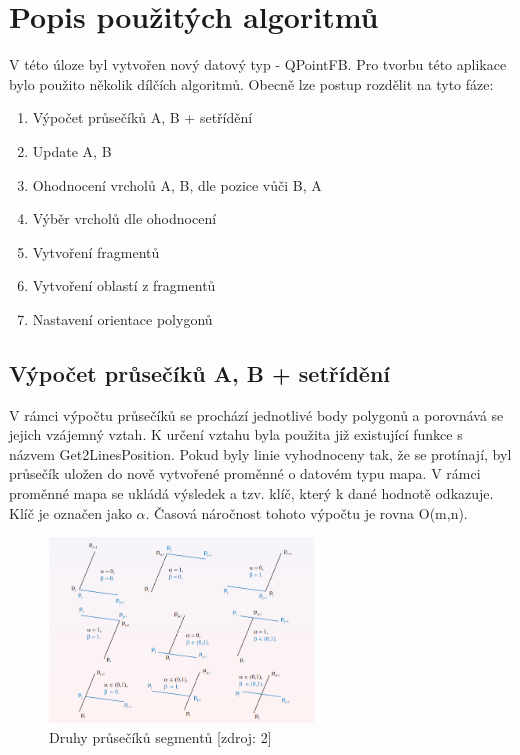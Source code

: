 \documentclass[a4paper, 12pt]{article}
\begin{document}
\section{Popis použitých algoritmů}
V této úloze byl vytvořen nový datový typ - QPointFB. Pro tvorbu této aplikace bylo použito několik dílčích algoritmů. Obecně lze postup rozdělit na tyto fáze:

\begin{enumerate}
\item Výpočet průsečíků A, B + setřídění
\item Update A, B
\item Ohodnocení vrcholů A, B, dle pozice vůči B, A
\item Výběr vrcholů dle ohodnocení
\item Vytvoření fragmentů
\item Vytvoření oblastí z fragmentů
\item Nastavení orientace polygonů
\end{enumerate}

\subsection{Výpočet průsečíků A, B + setřídění}
V rámci výpočtu průsečíků se prochází jednotlivé body polygonů a porovnává se jejich vzájemný vztah. K určení vztahu byla použita již existující funkce s názvem Get2LinesPosition. Pokud byly linie vyhodnoceny tak, že se protínají, byl průsečík uložen do nově vytvořené proměnné o datovém typu mapa. V rámci proměnné mapa se ukládá výsledek a tzv. klíč, který k dané hodnotě odkazuje. Klíč je označen jako $\alpha$. Časová náročnost tohoto výpočtu je rovna O(m,n).

\begin{figure}[h!]
	\centering
	\includegraphics[width=7cm]{pictures/prusecik.png}
	\caption{Druhy průsečíků segmentů [zdroj: 2]}
\end{figure}
\end{document}
